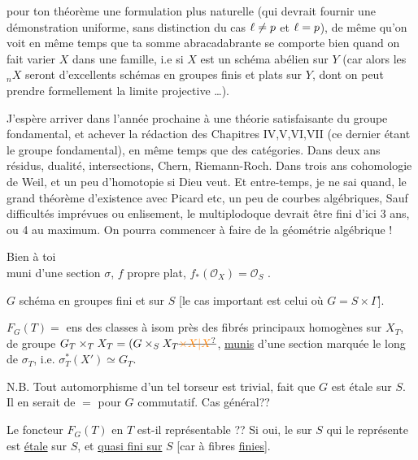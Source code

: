 pour ton théorème une formulation plus naturelle (qui devrait 
fournir une démonstration uniforme, sans distinction du cas $\ell\ne p$
et $\ell=p$), de même qu'on voit en même temps que ta somme abracadabrante se comporte bien quand on fait varier $X$ dans une famille, i.e
si $X$ est  un schéma abélien sur $Y$ (car alors les ${}_nX$
seront d'excellents schémas en groupes finis et plats sur $Y$, dont on
peut prendre formellement la limite projective \ldots).

J'espère arriver dans l'année prochaine à une théorie satisfaisante du groupe fondamental,  et achever la rédaction des
Chapitres IV,V,VI,VII (ce dernier étant le groupe fondamental), en
même temps que des catégories. Dans deux ans résidus, dualité,
intersections, Chern, Riemann-Roch. Dans trois ans cohomologie de
Weil, et un peu d'homotopie si Dieu veut. Et entre-temps, je ne sai
quand, le grand théorème d'existence avec Picard etc, un peu de
courbes algébriques,  Sauf difficultés imprévues ou enlisement,
le multiplodoque devrait être fini d'ici 3 ans, ou 4 au maximum. On
pourra commencer à faire de la géométrie algébrique !

Bien à toi\\
muni d'une section $\sigma$, $f$ propre plat, $f_*(\mathcal O_X)=\mathcal O_S$ \uline{}.

$G$ schéma en groupes  fini et   sur $S$
[le cas important est celui où $G=S\times\Gamma$].

$F_G(T)=$ ens des classes à isom près des
fibrés principaux homogènes sur $X_T$, de groupe
$G_T\times_T X_T=(G\times_{S} X_T\deleted{\unsure{\times X|X}}$, \uline{munis} d'une section
marquée le long de $\sigma_T$, i.e.  $\sigma_T^*(X')\simeq G_T$.

N.B. Tout automorphisme d'un tel torseur
est trivial,  fait que $G$
est  étale sur $S$. Il en serait de
$=$ pour $G$ commutatif. Cas général??

Le foncteur $F_G(T)$ en $T$ est-il
représentable ?? Si oui, le  sur $S$
qui le représente est \uline{étale} sur $S$, et
\uline{quasi fini sur} $S$ [car à fibres
\uline{finies}].

